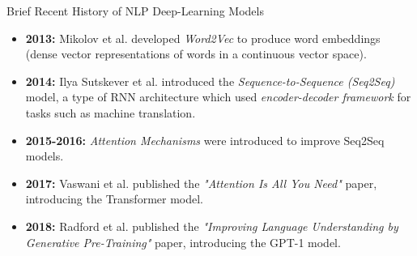 \documentclass[10pt]{beamer}
\begin{document}
\begin{frame}[fragile]{Brief Recent History of NLP Deep-Learning Models}
	\begin{itemize}

		\item \textbf{2013:} Mikolov et al. developed \textit{Word2Vec} to produce word embeddings (dense vector
		      representations of words in a continuous vector space).


		\item \textbf{2014:} Ilya Sutskever et al. introduced the \textit{Sequence-to-Sequence (Seq2Seq)} model,
		      a type of RNN architecture which used \textit{encoder-decoder framework} for tasks such as
		      machine translation.


		\item \textbf{2015-2016:} \textit{Attention Mechanisms} were introduced to improve Seq2Seq models.

		\item \textbf{2017:} Vaswani et al. published the \textit{"Attention Is All You Need"} paper, introducing
		      the Transformer model.

		\item \textbf{2018:} Radford et al. published the \textit{"Improving Language Understanding by Generative
			      Pre-Training"} paper, introducing the GPT-1 model.

	\end{itemize}
\end{frame}
\end{document}
